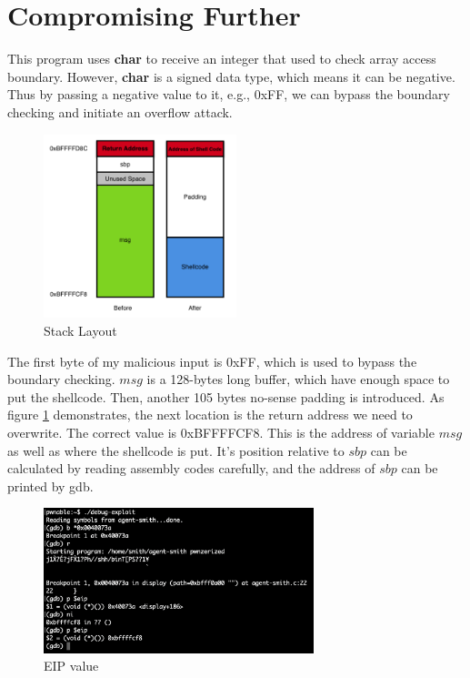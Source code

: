 \documentclass{article}
\begin{document}
\newpage
\section{Compromising Further}

This program uses \textbf{char} to receive an integer that used to check array access boundary. However, \textbf{char}
 is a signed data type, which means it can be negative. Thus by passing a negative value to it, e.g., 0xFF, we can bypass the boundary checking and initiate an overflow attack.
 
\begin{figure}[h]
\centering
\includegraphics[width=0.5\textwidth]{stack2.png}
\caption{\label{fig:stack2}Stack Layout}
\end{figure}

The first byte of my malicious input is 0xFF, which is used to bypass the boundary checking. $msg$ is a 128-bytes long buffer, which have enough space to put the shellcode. Then, another 105 bytes no-sense padding is introduced. As figure \ref{fig:stack2} demonstrates, the next location is the return address we need to overwrite. The correct value is 0xBFFFFCF8. This is the address of variable $msg$ as well as where the shellcode is put. It's position relative to $sbp$ can be calculated by reading assembly codes carefully, and the address of $sbp$ can be printed by gdb.

\begin{figure}[h]
\centering
\includegraphics[width=0.7\textwidth]{gdb2.png}
\caption{\label{fig:gdb2}EIP value}
\end{figure}
\end{document}
